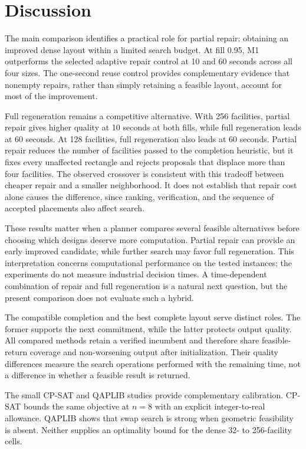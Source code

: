 \documentclass[preprint,12pt,authoryear,nonatbib]{elsarticle}
\begin{document}
\section{Discussion}
\label{sec:discussion}

The main comparison identifies a practical role for partial repair: obtaining
an improved dense layout within a limited search budget. At fill 0.95, M1
outperforms the selected adaptive repair control at 10 and 60 seconds across
all four sizes. The one-second reuse control provides complementary evidence
that nonempty repairs, rather than simply retaining a feasible layout, account
for most of the improvement.

Full regeneration remains a competitive alternative. With 256 facilities,
partial repair gives higher quality at 10 seconds at both fills, while full
regeneration leads at 60 seconds. At 128 facilities, full regeneration also
leads at 60 seconds. Partial repair reduces the number of facilities passed
to the completion heuristic, but it fixes every unaffected rectangle and
rejects proposals that displace more than four facilities. The observed
crossover is consistent with this tradeoff between cheaper repair and a
smaller neighborhood. It does not establish that repair cost alone causes the
difference, since ranking, verification, and the sequence of accepted
placements also affect search.

These results matter when a planner compares several feasible alternatives
before choosing which designs deserve more computation. Partial repair can
provide an early improved candidate, while further search may favor full
regeneration. This interpretation concerns computational performance on the
tested instances; the experiments do not measure industrial decision times.
A time-dependent combination of repair and full regeneration is a natural
next question, but the present comparison does not evaluate such a hybrid.

The compatible completion and the best complete layout serve distinct roles.
The former supports the next commitment, while the latter protects output
quality. All compared methods retain a verified incumbent and therefore share
feasible-return coverage and non-worsening output after initialization. Their
quality differences measure the search operations performed with the remaining
time, not a difference in whether a feasible result is returned.

The small CP-SAT and QAPLIB studies provide complementary calibration. CP-SAT
bounds the same objective at $n=8$ with an explicit integer-to-real allowance.
QAPLIB shows that swap search is strong when geometric feasibility is absent.
Neither supplies an optimality bound for the dense 32- to 256-facility cells.
\end{document}
